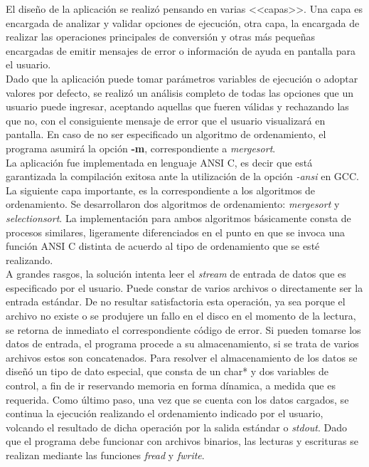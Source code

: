 \documentclass[a4paper,10pt]{article}
\begin{document}
El dise\~no de la aplicaci\'on se realiz\'o pensando en varias <<capas>>. Una capa es encargada de analizar y validar opciones de ejecuci\'on, otra capa, la encargada de realizar las operaciones principales de conversi\'on y otras m\'as peque\~nas encargadas de emitir mensajes de error o informaci\'on de ayuda en pantalla para el usuario.\\

Dado que la aplicaci\'on puede tomar par\'ametros variables de ejecuci\'on o adoptar valores por defecto, se realiz\'o un an\'alisis completo de todas las opciones que un usuario puede ingresar, aceptando aquellas que fueren v\'alidas y rechazando las que no, con el consiguiente mensaje de error que el usuario visualizar\'a en pantalla. En caso de no ser especificado un algoritmo de ordenamiento, el programa asumir\'a la opci\'on \textbf{-m}, correspondiente a \textit{mergesort}.\\

La aplicaci\'on fue implementada en lenguaje ANSI C, es decir que est\'a garantizada la compilaci\'on exitosa ante la utilizaci\'on de la opci\'on \textit{-ansi} en GCC.\\

La siguiente capa importante, es la correspondiente a los algoritmos de ordenamiento. Se desarrollaron dos algoritmos de ordenamiento: \textit{mergesort} y \textit{selectionsort}. La implementaci\'on para ambos algoritmos b\'asicamente consta de procesos similares, ligeramente diferenciados en el punto en que se invoca una funci\'on ANSI C distinta de acuerdo al tipo de ordenamiento que se est\'e realizando.\\

A grandes rasgos, la soluci\'on intenta leer el \textit{stream} de entrada de datos que es especificado por el usuario. Puede constar de varios archivos o directamente ser la entrada est\'andar. De no resultar satisfactoria esta operaci\'on, ya sea porque el archivo no existe o se produjere un fallo en el disco en el momento de la lectura, se retorna de inmediato el correspondiente c\'odigo de error. Si pueden tomarse los datos de entrada, el programa procede a su almacenamiento, si se trata de varios archivos estos son concatenados. Para resolver el almacenamiento de los datos se dise\~n\'o un tipo de dato especial, que consta de un char* y dos variables de control, a fin de ir reservando memoria en forma d\'inamica, a medida que es requerida. Como \'ultimo paso, una vez que se cuenta con los datos cargados, se continua la ejecuci\'on realizando el ordenamiento indicado por el usuario, volcando el resultado de dicha operaci\'on por la salida est\'andar o \textit{stdout}. Dado que el programa debe funcionar con archivos binarios, las lecturas y escrituras se realizan mediante las funciones \textit{fread} y \textit{fwrite}.\\
\end{document}
